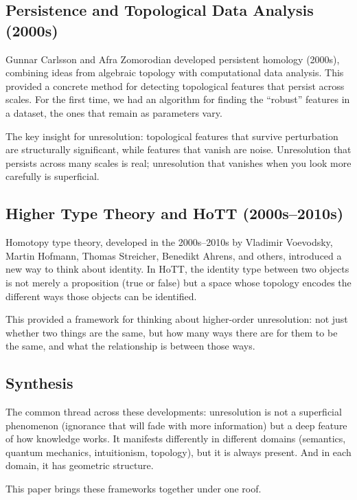 \documentclass[11pt,letterpaper]{article}
\theoremstyle{definition}
\theoremstyle{remark}
\begin{document}
\subsection{Persistence and Topological Data Analysis (2000s)}

Gunnar Carlsson and Afra Zomorodian developed persistent homology (2000s), combining ideas from algebraic topology with computational data analysis. This provided a concrete method for detecting topological features that persist across scales. For the first time, we had an algorithm for finding the ``robust'' features in a dataset, the ones that remain as parameters vary.

The key insight for unresolution: topological features that survive perturbation are structurally significant, while features that vanish are noise. Unresolution that persists across many scales is real; unresolution that vanishes when you look more carefully is superficial.

\subsection{Higher Type Theory and HoTT (2000s--2010s)}

Homotopy type theory, developed in the 2000s--2010s by Vladimir Voevodsky, Martin Hofmann, Thomas Streicher, Benedikt Ahrens, and others, introduced a new way to think about identity. In HoTT, the identity type between two objects is not merely a proposition (true or false) but a space whose topology encodes the different ways those objects can be identified.

This provided a framework for thinking about higher-order unresolution: not just whether two things are the same, but how many ways there are for them to be the same, and what the relationship is between those ways.

\subsection{Synthesis}

The common thread across these developments: unresolution is not a superficial phenomenon (ignorance that will fade with more information) but a deep feature of how knowledge works. It manifests differently in different domains (semantics, quantum mechanics, intuitionism, topology), but it is always present. And in each domain, it has geometric structure.

This paper brings these frameworks together under one roof.
\end{document}
